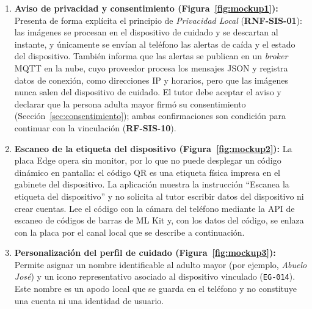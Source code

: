 \documentclass[12pt,a4paper,oneside]{book}
\theoremstyle{plain}
\theoremstyle{definition}
\theoremstyle{remark}
\begin{document}
\begin{enumerate}
    \item \textbf{Aviso de privacidad y consentimiento (Figura~\ref{fig:mockup1}):} Presenta de forma explícita el principio de \textit{Privacidad Local} (\textbf{RNF-SIS-01}): las imágenes se procesan en el dispositivo de cuidado y se descartan al instante, y únicamente se envían al teléfono las alertas de caída y el estado del dispositivo. También informa que las alertas se publican en un \textit{broker} MQTT en la nube, cuyo proveedor procesa los mensajes JSON y registra datos de conexión, como direcciones IP y horarios, pero que las imágenes nunca salen del dispositivo de cuidado. El tutor debe aceptar el aviso y declarar que la persona adulta mayor firmó su consentimiento (Sección~\ref{sec:consentimiento}); ambas confirmaciones son condición para continuar con la vinculación (\textbf{RF-SIS-10}).
    \item \textbf{Escaneo de la etiqueta del dispositivo (Figura~\ref{fig:mockup2}):} La placa Edge opera sin monitor, por lo que no puede desplegar un código dinámico en pantalla: el código QR es una etiqueta física impresa en el gabinete del dispositivo. La aplicación muestra la instrucción \enquote{Escanea la etiqueta del dispositivo} y no solicita al tutor escribir datos del dispositivo ni crear cuentas. Lee el código con la cámara del teléfono mediante la API de escaneo de códigos de barras de ML Kit \parencite{google2026mlkitbarcode} y, con los datos del código, se enlaza con la placa por el canal local que se describe a continuación.
    \item \textbf{Personalización del perfil de cuidado (Figura~\ref{fig:mockup3}):} Permite asignar un nombre identificable al adulto mayor (por ejemplo, \textit{Abuelo José}) y un icono representativo asociado al dispositivo vinculado (\texttt{EG-014}). Este nombre es un apodo local que se guarda en el teléfono y no constituye una cuenta ni una identidad de usuario.
\end{enumerate}
\end{document}

